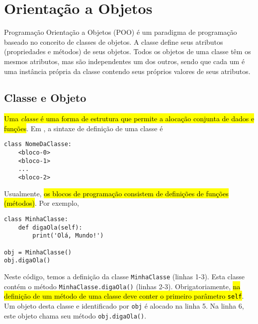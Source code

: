 
\chapter{Orientação a Objetos}\label{cap_poo}
\thispagestyle{fancy}

Programação Orientação a Objetos (POO) é um paradigma de programação baseado no conceito de classes de objetos. A classe define seus atributos (propriedades e métodos) de seus objetos. Todos os objetos de uma classe têm os mesmos atributos, mas são independentes um dos outros, sendo que cada um é uma instância própria da classe contendo seus próprios valores de seus atributos.

\section{Classe e Objeto}\label{cap_ob_sec_class}

\hl{Uma \emph{classe} é uma forma de estrutura que permite a alocação conjunta de dados e funções}. Em {\python}, a sintaxe de definição de uma classe é

\begin{lstlisting}
class NomeDaClasse:
    <bloco-0>
    <bloco-1>
    ...
    <bloco-2>
\end{lstlisting}

Usualmente, \hl{os blocos de programação consistem de definições de funções (métodos)}. Por exemplo,

\begin{lstlisting}
class MinhaClasse:
    def digaOla(self):
        print('Olá, Mundo!')

obj = MinhaClasse()
obj.digaOla()
\end{lstlisting}

Neste código, temos a definição da classe \lstinline+MinhaClasse+ (linhas 1-3). Esta classe contém o método \lstinline+MinhaClasse.digaOla()+ (linhas 2-3). Obrigatoriamente, \hl{na definição de um método de uma classe deve conter o primeiro parâmetro \texttt{self}}. Um objeto desta classe e identificado por \lstinline+obj+ é alocado na linha 5. Na linha 6, este objeto chama seu método \lstinline+obj.digaOla()+.

